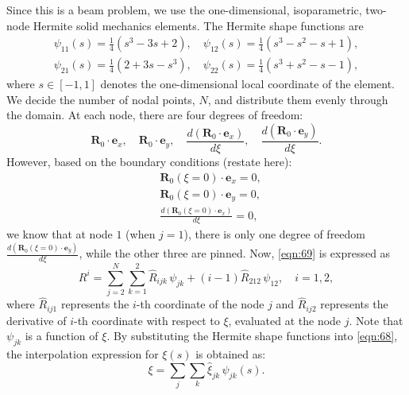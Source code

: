 \documentclass[12pt,MSc,twoside]{muthesis_2020}
\begin{document}
Since this is a beam problem, we use the one-dimensional, isoparametric, two-node Hermite solid mechanics elements. The Hermite shape functions are 
\begin{equation}
	\label{eqn:77}
 \begin{aligned}
         \psi_{11}(s)=\frac{1}{4}(s^3-3s+2), \quad \psi_{12}(s)=\frac{1}{4}(s^3-s^2-s+1),\\
         \psi_{21}(s)=\frac{1}{4}(2+3s-s^3), \quad \psi_{22}(s)=\frac{1}{4}(s^3+s^2-s-1),
 \end{aligned}
\end{equation}
where $s\in [-1,1]$ denotes the one-dimensional local coordinate of the element.
We decide the number of nodal points, $N$, and distribute them evenly through the domain. At each node, there are four degrees of freedom: 
\begin{equation}
    \label{eqn:87}
    \mathbf{R}_0\cdot\mathbf{e}_x, \quad\mathbf{R}_0\cdot\mathbf{e}_y, \quad\frac{d\left(\mathbf{R}_0\cdot\mathbf{e}_x\right)}{d\xi},\quad\frac{d\left(\mathbf{R}_0\cdot\mathbf{e}_y\right)}{d\xi}.
\end{equation}
However, based on the boundary conditions (restate here): 
\begin{equation}
    \label{eqn:85}
    \begin{aligned}
      &\mathbf{R}_0(\xi=0)\cdot\mathbf{e}_x=0, \\
      &\mathbf{R}_0(\xi=0)\cdot\mathbf{e}_y=0,\\
      &\frac{d\left(\mathbf{R}_0(\xi=0)\cdot\mathbf{e}_x\right)}{d\xi}=0,
    \end{aligned}
\end{equation}
we know that at node $1$ (when $j=1$), there is only one degree of freedom $\frac{d\left(\mathbf{R}_0(\xi=0)\cdot\mathbf{e}_y\right)}{d\xi}$, while the other three are pinned.
Now, \eqref{eqn:69} is expressed as
\begin{equation}
	\label{eqn:79}
    R^i=\sum_{j=2}^{N} \sum_{k=1}^2 \hat{R}_{ijk}\,\psi_{jk}+(i-1)\hat{R}_{212}\,\psi_{12}, \quad i=1,2,
\end{equation}
where $\hat{R}_{ij1}$ represents the $i$-th coordinate of the node $j$ and $\hat{R}_{ij2}$ represents the derivative of $i$-th coordinate with respect to $\xi$, evaluated at the node $j$. Note that $\psi_{jk}$ is a function of $\xi$. By substituting the Hermite shape functions into \eqref{eqn:68}, the interpolation expression for $\xi(s)$ is obtained as:
\begin{equation}
	\label{eqn:99}
    \xi=\sum_j\sum_k \hat{\xi}_{jk}\, \psi_{jk}(s).
\end{equation}
\end{document}
